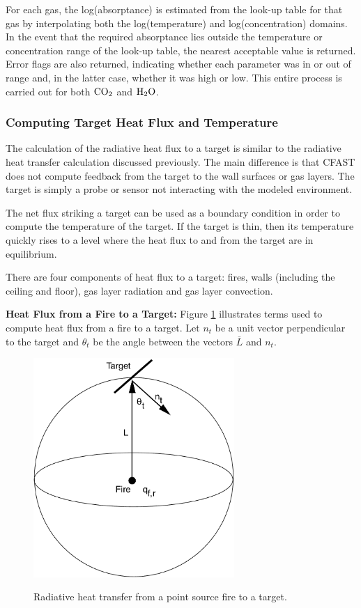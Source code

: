 For each gas, the log(absorptance) is estimated from the look-up table for that gas  by  interpolating both the log(temperature) and log(concentration) domains. In the event that the required absorptance lies outside the temperature or concentration range of the look-up table, the nearest acceptable value is returned. Error flags are also returned, indicating whether each parameter was in or out of range and, in the latter case, whether it was high or low.  This entire process is carried out for both $\textnormal{CO}_2$  and $\textnormal{H}_2 \textnormal{O}$.

\subsubsection{Computing Target Heat Flux and Temperature}

The calculation of the radiative heat flux to a target is similar to the radiative heat transfer calculation discussed previously.  The main difference is that CFAST does not compute feedback from the target to the wall surfaces or gas layers.  The target is simply a probe or sensor not interacting with the modeled environment.

The net flux striking a target can be used as a boundary condition in order to compute the temperature of the target.  If the target is thin, then its temperature quickly rises to a level where the heat flux to and from the target are in equilibrium.

There are four components of heat flux to a target: fires, walls (including the ceiling and floor), gas layer radiation and gas layer convection.

{\bf Heat Flux from a Fire to a Target:} Figure \ref{fig:Rad_Fire} illustrates terms used to compute heat flux from a fire to a target. Let $n_t$ be a unit vector perpendicular to the target and $\theta_t$ be the angle between the vectors $\overline{L}$ and $n_t$.

\begin{figure}
\begin{center}
\includegraphics[width=3.0in]{FIGURES/Theory/Radiation_Fire}\\
\end{center}
\caption{Radiative heat transfer from a point source fire to a target.}
 \label{fig:Rad_Fire}
\end{figure}

